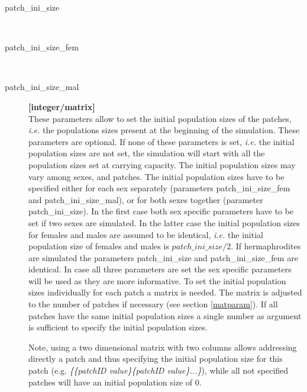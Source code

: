 \documentclass[letterpaper,12pt,oneside]{book}
\begin{document}
\begin{description}

\item[patch\_ini\_size]\hspace*{\fill}\\
\vspace{-9mm}
\item[patch\_ini\_size\_fem]\hspace*{\fill}\\
\vspace{-9mm}
\item[patch\_ini\_size\_mal]\textbf{[integer/matrix]}\\
These parameters allow to set the initial population sizes of the patches, \textit{i.e.} the populations sizes present at the beginning of the simulation. These parameters are optional. If none of these parameters is set, \textit{i.e.} the initial population sizes are not set, the simulation will start with all the population sizes set at carrying capacity. The initial population sizes may vary among sexes, and patches. The initial population sizes have to be specified either for each sex separately (parameters \textsf{patch\_ini\_size\_fem} and \textsf{patch\_ini\_size\_mal}), or for both sexes together (parameter \textsf{patch\_ini\_size}). In the first case both sex specific parameters have to be set if two sexes are simulated. In the latter case the initial population sizes for females and males are assumed to be identical, \textit{i.e.} the initial population size of females and males is $patch\_ini\_size/2$. If hermaphrodites are simulated the parameters \textsf{patch\_ini\_size} and \textsf{patch\_ini\_size\_fem} are identical. In case all three parameters are set the sex specific parameters will be used as they are more informative. To set the initial population sizes individually for each patch a matrix is needed. The matrix is adjusted to the number of patches if necessary (see section \ref{matparam}). If all patches have the same initial population sizes a single number as argument is sufficient to specify the initial population sizes.

Note, using a two dimensional matrix with two columns allows addressing directly a patch and thus specifying the initial population size for this patch (e.g. \textit{\{\{patchID value\}\{patchID value\}...\}}), while all not specified patches will have an initial population size of 0.
\end{description}
\end{document}
